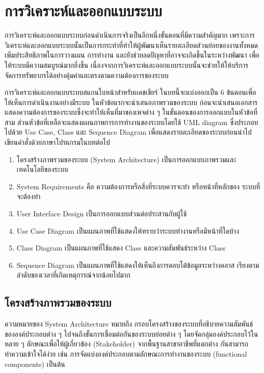 \chapter{การวิเคราะห์และออกแบบระบบ}

การวิเคราะห์และออกแบบระบบก่อนดำเนินการจริงเป็นอีกหนึ่งขั้นตอนที่มีความสำคัญมาก เพราะการวิเคราะห์และออกแบบระบบนั้นเป็นการกระทำที่ทำให้ผู้พัฒนาเห็นรายละเอียดส่วนย่อยของงานทั้งหมด เพิ่มประสิทธิภาพในการวางแผน การทำงาน และยังช่วยลดปัญหาที่อาจจะเกิดขึ้นในระหว่างพัฒนา เพื่อให้ระบบมีความสมบูรณ์มากยิ่งขึ้น เนื่องจากการวิเคราะห์และออกแบบระบบนั้นจะช่วยให้ให้บริการ จัดการทรัพยากรได้อย่างคุ้มค่าและตรงตามความต้องการของระบบ

การวิเคราะห์และออกแบบระบบสแกนใบหน้าสำหรับเเคชเชียร์ ในบทนี้จะแบ่งออกเป็น 6 ข้นตอนเพื่อให้เห็นการดำเนินงานอย่างมีระบบ ในหัวข้อแรกจะนำเสนอภาพรวมของระบบ ก่อนจะนำเสนอเอกสารแสดงความต้องการของระบบซึ่งจะทำให้เห็นที่มาของเพจต่าง ๆ ในขั้นตอนของการออกแบบในหัวข้อที่สาม ส่วนหัวข้อที่เหลือจะแสดงแผนภาพการการทำงานของระบบโดยใช้ UML diagram ซึ่งประกอบไปด้วย Use Case, Class และ Sequence Diagram เพื่อแสดงรายละเอียดของระบบก่อนนำไปเขียนคำสั่งด้วยภาษาโปรแกรมในบทต่อไป

\begin{enumerate}[label=3.\arabic*]
	\item โครงสร้างภาพรวมของระบบ (System Architecture) เป็นการออกแบบภาพรวมและเทคโนโลยีของระบบ	
	\item System Requirements คือ ความต้องการหรือสิ่งที่ระบบควรจะทำ หรือหน้าที่หลักของ
	ระบบที่จะต้องทำ
	\item User Interface Design เป็นการออกแบบส่วนต่อประสานกับผู้ใช้
	\item Use Case Diagram เป็นแผนภาพที่ใช้แสดงให้ทราบว่าระบบทำงานหรือมีหน้าที่ใดบ้าง
	\item Class Diagram เป็นแผนภาพที่ใช้แสดง Class และความสัมพันธ์ระหว่าง Class
	\item Sequence Diagram เป็นแผนภาพที่ใช้แสดงให้เห็นถึงการตอบโต้ข้อมูลระหว่างคลาส เรียงตามลำดับของเวลาที่เกิดเหตุการณ์จากน้อยไปมาก
\end{enumerate}	

\section{โครงสร้างภาพรวมของระบบ}
    ความหมายของ System Architecture  หมายถึง กรอบโครงสร้างของระบบที่อธิบายความสัมพันธ์ขององค์ประกอบต่าง ๆ ไปจนถึงขั้นการเชื่อมต่อกันของระบบย่อยต่าง ๆ โดยจัดกลุ่มองค์ประกอบไว้ในหลาย ๆ ลักษณะเพื่อให้ผู้เกี่ยวข้อง (Stakeholder) จากพื้นฐานสาขาอาชีพที่แตกต่าง กันสามารถทำความเข้าใจได้ง่าย เช่น การจัดแบ่งองค์ประกอบตามลักษณะการทำงานของระบบ (functional components) เป็นต้น
    
